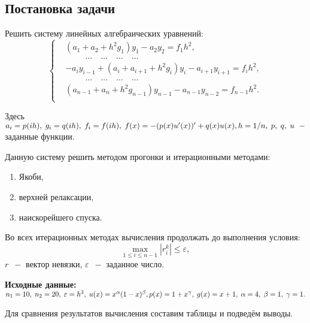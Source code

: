 \documentclass[a4paper,12pt]{article}
\begin{document}
\begin{center}
\section{Постановка задачи}
\end{center}
\hspace{1.25cm}Решить систему линейных алгебраических уравнений:
\begin{equation}\label{eq:main_sys}
    \begin{cases}
        &(a_1 + a_2 + h^2g_1)y_1 - a_2y_2 = f_1h^2,\\
        &\hspace{1cm}\dots \quad \dots \quad \dots \quad \dots\\
        &-a_i y_{i-1} + (a_i + a_{i+1} + h^2g_i)y_i - a_{i+1}y_{i+1} = f_i h^2,\\
        &\hspace{1cm}\dots \quad \dots \quad \dots \quad \dots\\
        &(a_{n-1} + a_{n} + h^2g_{n-1})y_{n-1} - a_{n-1}y_{n-2} = f_{n-1} h^2.\\
    \end{cases}
\end{equation}

Здесь $a_i = p(ih),\;g_i = q(ih),\;f_i = f(ih),\;f(x) = -(p(x)u'(x))' + q(x)u(x),\;\\h = 1/n,\;p,\;q,\;u\;~-$ заданные функции.

Данную систему решить методом прогонки и итерационными методами:
\begin{enumerate}[label = \arabic*.]
    \item Якоби,
    \item верхней релаксации,
    \item наискорейшего спуска.
\end{enumerate}

Во всех итерационных методах вычисления продолжать до выполнения условия:
\begin{equation*}
    \max_{1 \le i \le n - 1} \left|r_{i}^{k}\right| \le \varepsilon,
\end{equation*}
$r\;~-$ вектор невязки, $\varepsilon\;~-$ заданное число.

\textbf{Исходные данные:} $n_1 = 10,\; n_2 = 20,\;\varepsilon = h^3,\;u(x) = x^{\alpha}(1-x)^{\beta},\;\\p(x) = 1 + x^{\gamma},\;g(x) = x + 1,\;\alpha = 4,\;\beta = 1,\;\gamma = 1.$

Для сравнения результатов вычисления составим таблицы и подведём выводы.
\newpage
\end{document}
